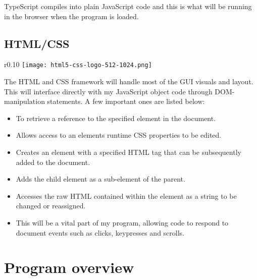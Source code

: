         TypeScript compiles into plain JavaScript code and this is what will be running in the browser when the program is loaded.

    \subsection{HTML/CSS}
    \label{html/css}

        \begin{wrapfigure}{r}{0.10\textwidth}
            \centering
            \texttt{[image: html5-css-logo-512-1024.png]}
        \end{wrapfigure}

        The HTML and CSS framework will handle most of the GUI visuals and layout. This will interface directly with my JavaScript object code through DOM-manipulation statements. A few important ones are listed below:

        \begin{itemize}
            \item {} To retrieve a reference to the specified element in the document.

            \item {} Allows access to an elements runtime CSS properties to be edited.

            \item {} Creates an element with a specified HTML tag that can be subsequently added to the document.

            \item {} Adds the child element as a sub-element of the parent.

            \item {} Accesses the raw HTML contained within the element as a string to be changed or reassigned.

            \item {} This will be a vital part of my program, allowing code to respond to document events such as clicks, keypresses and scrolls.
        \end{itemize}

\section{Program overview}

